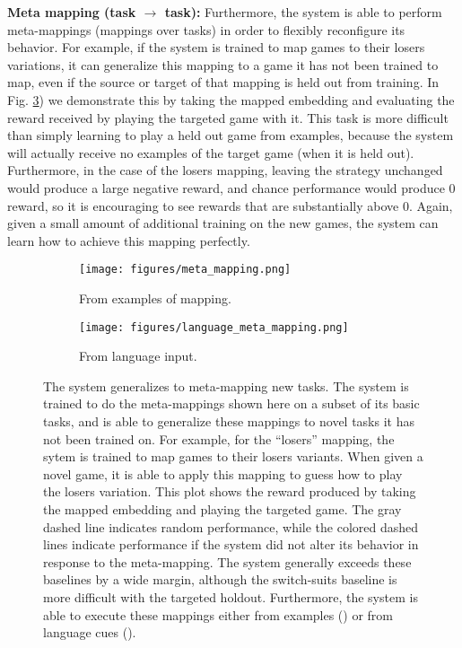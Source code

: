 \documentclass{article}
\begin{document}
\textbf{Meta mapping (task $\rightarrow$ task):} Furthermore, the system is able to perform meta-mappings (mappings over tasks) in order to flexibly reconfigure its behavior. For example, if the system is trained to map games to their losers variations, it can generalize this mapping to a game it has not been trained to map, even if the source or target of that mapping is held out from training. In Fig. \ref{cards_meta_map_results}) we demonstrate this by taking the mapped embedding and evaluating the reward received by playing the targeted game with it. This task is more difficult than simply learning to play a held out game from examples, because the system will actually receive no examples of the target game (when it is held out). Furthermore, in the case of the losers mapping, leaving the strategy unchanged would produce a large negative reward, and chance performance would produce 0 reward, so it is encouraging to see rewards that are substantially above 0. Again, given a small amount of additional training on the new games, the system can learn how to achieve this mapping perfectly. \par
\begin{figure}
\centering
\begin{subfigure}{0.5\textwidth}
\texttt{[image: figures/meta\_mapping.png]}
\caption{From examples of mapping.}
\label{cards_meta_map_results_examples}
\end{subfigure}%
\begin{subfigure}{0.5\textwidth}
\texttt{[image: figures/language\_meta\_mapping.png]}
\caption{From language input.}
\label{cards_meta_map_results_language}
\end{subfigure}
\caption{The system generalizes to meta-mapping new tasks. The system is trained to do the meta-mappings shown here on a subset of its basic tasks, and is able to generalize these mappings to novel tasks it has not been trained on. For example, for the ``losers'' mapping, the sytem is trained to map games to their losers variants. When given a novel game, it is able to apply this mapping to guess how to play the losers variation. This plot shows the reward produced by taking the mapped embedding and playing the targeted game. The gray dashed line indicates random performance, while the colored dashed lines indicate performance if the system did not alter its behavior in response to the meta-mapping. The system generally exceeds these baselines by a wide margin, although the switch-suits baseline is more difficult with the targeted holdout. Furthermore, the system is able to execute these mappings either from examples () or from language cues ().}
\label{cards_meta_map_results}
\end{figure}
\end{document}
